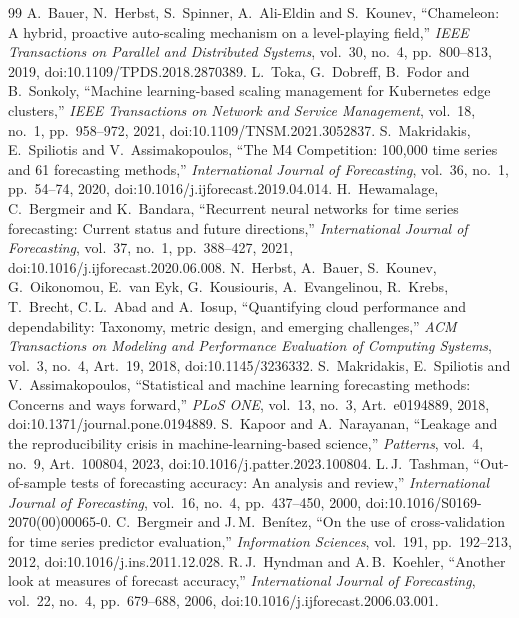 \documentclass[conference,a4paper]{IEEEtran}
\begin{document}
\begin{thebibliography}{99}
 A.\ Bauer, N.\ Herbst, S.\ Spinner, A.\ Ali-Eldin and S.\ Kounev, ``Chameleon: A hybrid, proactive auto-scaling mechanism on a level-playing field,'' \textit{IEEE Transactions on Parallel and Distributed Systems}, vol.~30, no.~4, pp.~800--813, 2019, doi:10.1109/TPDS.2018.2870389.
 L.\ Toka, G.\ Dobreff, B.\ Fodor and B.\ Sonkoly, ``Machine learning-based scaling management for Kubernetes edge clusters,'' \textit{IEEE Transactions on Network and Service Management}, vol.~18, no.~1, pp.~958--972, 2021, doi:10.1109/TNSM.2021.3052837.
 S.\ Makridakis, E.\ Spiliotis and V.\ Assimakopoulos, ``The M4 Competition: 100,000 time series and 61 forecasting methods,'' \textit{International Journal of Forecasting}, vol.~36, no.~1, pp.~54--74, 2020, doi:10.1016/j.ijforecast.2019.04.014.
 H.\ Hewamalage, C.\ Bergmeir and K.\ Bandara, ``Recurrent neural networks for time series forecasting: Current status and future directions,'' \textit{International Journal of Forecasting}, vol.~37, no.~1, pp.~388--427, 2021, doi:10.1016/j.ijforecast.2020.06.008.
 N.\ Herbst, A.\ Bauer, S.\ Kounev, G.\ Oikonomou, E.\ van Eyk, G.\ Kousiouris, A.\ Evangelinou, R.\ Krebs, T.\ Brecht, C.\,L.\ Abad and A.\ Iosup, ``Quantifying cloud performance and dependability: Taxonomy, metric design, and emerging challenges,'' \textit{ACM Transactions on Modeling and Performance Evaluation of Computing Systems}, vol.~3, no.~4, Art.~19, 2018, doi:10.1145/3236332.
 S.\ Makridakis, E.\ Spiliotis and V.\ Assimakopoulos, ``Statistical and machine learning forecasting methods: Concerns and ways forward,'' \textit{PLoS ONE}, vol.~13, no.~3, Art.~e0194889, 2018, doi:10.1371/journal.pone.0194889.
 S.\ Kapoor and A.\ Narayanan, ``Leakage and the reproducibility crisis in machine-learning-based science,'' \textit{Patterns}, vol.~4, no.~9, Art.~100804, 2023, doi:10.1016/j.patter.2023.100804.
 L.\,J.\ Tashman, ``Out-of-sample tests of forecasting accuracy: An analysis and review,'' \textit{International Journal of Forecasting}, vol.~16, no.~4, pp.~437--450, 2000, doi:10.1016/S0169-2070(00)00065-0.
 C.\ Bergmeir and J.\,M.\ Ben\'itez, ``On the use of cross-validation for time series predictor evaluation,'' \textit{Information Sciences}, vol.~191, pp.~192--213, 2012, doi:10.1016/j.ins.2011.12.028.
 R.\,J.\ Hyndman and A.\,B.\ Koehler, ``Another look at measures of forecast accuracy,'' \textit{International Journal of Forecasting}, vol.~22, no.~4, pp.~679--688, 2006, doi:10.1016/j.ijforecast.2006.03.001.

\end{thebibliography}
\end{document}
